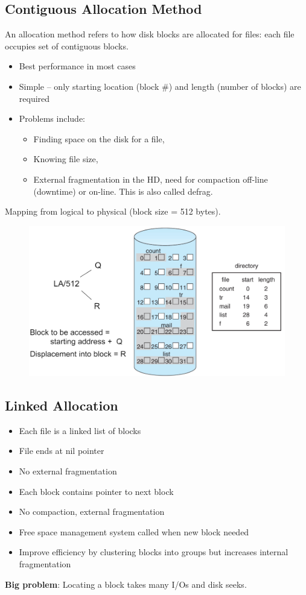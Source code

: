 \newpage
\subsection{Contiguous Allocation Method }

An allocation method refers to how disk blocks are allocated for files: each file occupies set of contiguous blocks.

\begin{itemize}
    \item Best performance in most cases
    \item Simple – only starting location (block \#) and length (number of blocks) are required
    \item Problems include:
    \begin{itemize}
    \item Finding space on the disk for a file,
    \item Knowing file size,
    \item External fragmentation in the HD, need for compaction off-line (downtime) or on-line. This is also called defrag.
    \end{itemize}
\end{itemize}

Mapping from logical to physical (block size = 512 bytes).

\begin{figure}[h!]
    \centering
    \includegraphics[width=0.6\linewidth]{img/srymkh.png}
\end{figure}


\subsection{Linked Allocation}

\begin{itemize}
    \item[] Each file is a linked list of blocks
    \item[] File ends at nil pointer
    \item[] No external fragmentation
    \item[] Each block contains pointer to next block
    \item[] No compaction, external fragmentation
    \item[] Free space management system called when new block needed
    \item[] Improve efficiency by clustering blocks into groups but increases internal fragmentation
\end{itemize}
\textbf{Big problem}: Locating a block takes many I/Os and disk seeks.

